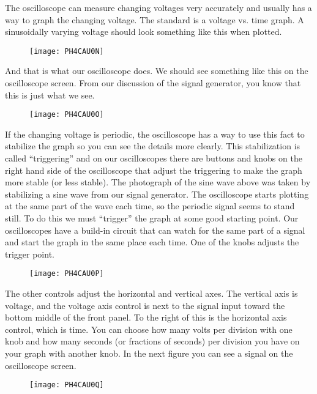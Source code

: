 The oscilloscope can measure changing voltages very accurately and usually has a way to graph the changing voltage. The standard is a voltage vs. time graph. A sinusoidally varying voltage should look something like this when plotted. 

\begin{figure}[h!]
	\centering
    \texttt{[image: PH4CAU0N]}
\end{figure}

And that is what our oscilloscope does. We should see something like this on the oscilloscope screen. From our discussion of the signal generator, you know that this is just what we see.

\begin{figure}[h!]
	\centering
    \texttt{[image: PH4CAU0O]}
\end{figure}

If the changing voltage is periodic, the oscilloscope has a way to use this fact to stabilize the graph so you can see the details more clearly. This stabilization is called ``triggering'' and
on our oscilloscopes there are buttons and knobs on the right hand side of the oscilloscope that adjust the triggering to make the graph more stable (or less stable). The photograph of the sine wave above was taken by stabilizing a sine wave from our signal generator. The oscilloscope starts
plotting at the same part of the wave each time, so the periodic signal seems to stand still. To do this we must ``trigger'' the graph at some good starting point. Our oscilloscopes have a build-in circuit that can watch for the same part of a signal and start the graph in the same place each time. One of the knobs adjusts the trigger point. 

\begin{figure}[h!]
	\centering
    \texttt{[image: PH4CAU0P]}
\end{figure}

The other controls adjust the horizontal and vertical axes. The vertical axis is voltage, and the voltage axis control is next to the signal input toward the bottom middle of the front panel. To the right of this is the horizontal axis control, which is time. You can choose how many volts per division with one knob and how many seconds (or fractions of seconds) per division you have on your graph with another knob. In the next figure you can see a signal on the oscilloscope screen. 

\begin{figure}[h!]
	\centering
	\texttt{[image: PH4CAU0Q]}
\end{figure}

